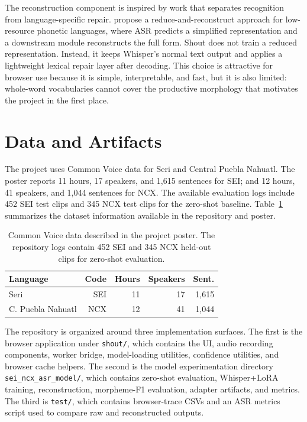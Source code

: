 \documentclass[11pt]{article}
\begin{document}
The reconstruction component is inspired by work that separates recognition from language-specific repair. \citet{diwan2021reduce} propose a reduce-and-reconstruct approach for low-resource phonetic languages, where ASR predicts a simplified representation and a downstream module reconstructs the full form. Shout does not train a reduced representation. Instead, it keeps Whisper's normal text output and applies a lightweight lexical repair layer after decoding. This choice is attractive for browser use because it is simple, interpretable, and fast, but it is also limited: whole-word vocabularies cannot cover the productive morphology that motivates the project in the first place.

\section{Data and Artifacts}

The project uses Common Voice data for Seri and Central Puebla Nahuatl. The poster reports 11 hours, 17 speakers, and 1,615 sentences for SEI; and 12 hours, 41 speakers, and 1,044 sentences for NCX. The available evaluation logs include 452 SEI test clips and 345 NCX test clips for the zero-shot baseline. Table~\ref{tab:data} summarizes the dataset information available in the repository and poster.

\begin{table}[t]
\centering
\scriptsize
\begin{tabular}{lrrrr}
\toprule
Language & Code & Hours & Speakers & Sent.\\
\midrule
Seri & SEI & 11 & 17 & 1,615\\
C. Puebla Nahuatl & NCX & 12 & 41 & 1,044\\
\bottomrule
\end{tabular}
\caption{Common Voice data described in the project poster. The repository logs contain 452 SEI and 345 NCX held-out clips for zero-shot evaluation.}
\label{tab:data}
\end{table}

The repository is organized around three implementation surfaces. The first is the browser application under \texttt{shout/}, which contains the UI, audio recording components, worker bridge, model-loading utilities, confidence utilities, and browser cache helpers. The second is the model experimentation directory \texttt{sei\_ncx\_asr\_model/}, which contains zero-shot evaluation, Whisper+LoRA training, reconstruction, morpheme-F1 evaluation, adapter artifacts, and metrics. The third is \texttt{test/}, which contains browser-trace CSVs and an ASR metrics script used to compare raw and reconstructed outputs.
\end{document}
